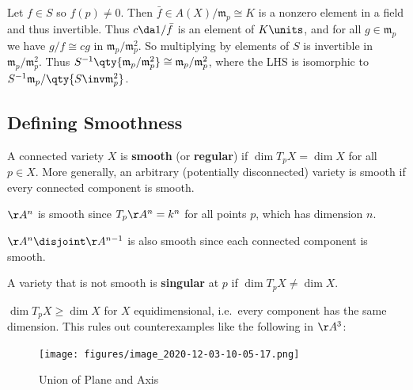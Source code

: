 Let \(f\in S\) so \(f(p) \neq 0\). Then
\(\bar f\in A(X) / \mathfrak{m}_p \cong K\) is a nonzero element in a
field and thus invertible. Thus \(c\da 1/\bar f\) is an element of
\(K\units\), and for all \(g\in \mathfrak{m}_p\) we have
\(g/f \cong cg\) in \(\mathfrak{m}_p / \mathfrak{m}_p^2\). So
multiplying by elements of \(S\) is invertible in
\(\mathfrak{m}_p / \mathfrak{m}_p^2\). Thus
\(S^{-1} \qty{\mathfrak{m}_p / \mathfrak{m}_p^2} \cong \mathfrak{m}_p / \mathfrak{m}_p^2\),
where the LHS is isomorphic to
\(S^{-1} \mathfrak{m}_p / \qty{S\inv \mathfrak{m}_p^2}\).

\hypertarget{defining-smoothness}{%
\subsection{Defining Smoothness}\label{defining-smoothness}}

\begin{definition}

A connected variety \(X\) is \textbf{smooth} (or \textbf{regular}) if
\(\dim T_p X = \dim X\) for all \(p\in X\). More generally, an arbitrary
(potentially disconnected) variety is smooth if every connected
component is smooth.

\end{definition}

\begin{example}[?]

\(\AA^n\) is smooth since \(T_p \AA^n = k^n\) for all points \(p\),
which has dimension \(n\).

\end{example}

\begin{example}[?]

\(\AA^n \disjoint \AA^{n-1}\) is also smooth since each connected
component is smooth.

\end{example}

\begin{definition}

A variety that is not smooth is \textbf{singular} at \(p\) if
\(\dim T_p X \neq \dim X\).

\end{definition}

\begin{fact}

\(\dim T_p X\geq \dim X\) for \(X\) equidimensional, i.e.~every
component has the same dimension. This rules out counterexamples like
the following in \(\AA^3\):

\begin{figure}
\centering
\texttt{[image: figures/image\_2020-12-03-10-05-17.png]}
\caption{Union of Plane and Axis}
\end{figure}

\end{fact}

